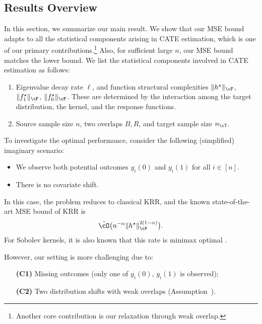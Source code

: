 \documentclass[12pt,a4paper,pdftex,onepage]{article}
\begin{document}
\subsection{Results Overview}\label{subsection; summary of results}
In this section, we summarize our main result. 
We show that our MSE bound adapts to all the statistical components arising in CATE estimation, which is one of our primary contributions.\footnote{Another core contribution is our relaxation through weak overlap.} 
Also, for sufficient large \(n\), our MSE bound matches the lower bound.
We list the statistical components involved in CATE estimation as follows:
\begin{enumerate}
\item Eigenvalue decay rate \(\ell\), and function structural complexities \(\|h^\star \|_{\cF}\), \(\|f_1^\star \|_{\cF}\), \(\|f_0^\star \|_{\cF}\). 
These are determined by the interaction among the target distribution, the kernel, and the response functions.
\item Source sample size \(n\), two overlaps \(B,R\), and target sample size \(n_\cT\).
\end{enumerate}

To investigate the optimal performance, consider the following (simplified) imaginary scenario:
\begin{itemize}
\item We observe both potential outcomes \(y_i(0)\) and \(y_i(1)\) for all \(i \in [n]\).
\item There is no covariate shift.
\end{itemize}
In this case, the problem reduces to classical KRR, and the known state-of-the-art MSE bound of KRR is \citep{wainwright2019high,fischer2020sobolev}
\begin{equation}\label{equation; imaginary MSE}
\tilde{\cO}\bigl(n^{-\alpha} \|h^\star\|_{\cF}^{2(1-\alpha)} \bigr).
\end{equation}
For Sobolev kernels, it is also known that this rate is minimax optimal \citep{green2021minimax}.

However, our setting is more challenging due to:
\begin{itemize}
\item[\textbf{(C1)}] Missing outcomes (only one of \(y_i(0)\), \(y_i(1)\) is observed);
\item[\textbf{(C2)}] Two distribution shifts with weak overlaps (Assumption~).
\end{itemize}
\end{document}
